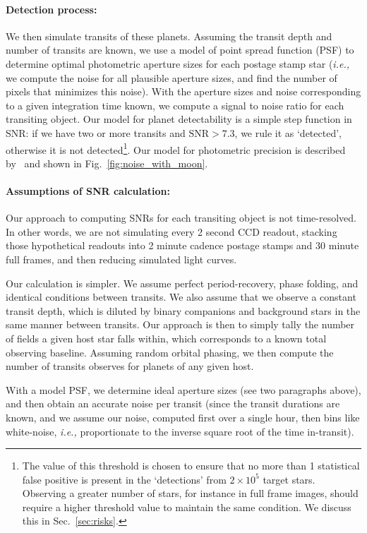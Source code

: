 \paragraph{Detection process:}
We then simulate transits of these planets.  Assuming the transit
depth and number of transits are known, we use a model of \tesss point
spread function (PSF) to determine optimal photometric aperture sizes
for each postage stamp star (\textit{i.e.,} we compute the noise for
all plausible aperture sizes, and find the number of pixels that
minimizes this noise).  With the aperture sizes and noise
corresponding to a given integration time known, we compute a signal
to noise ratio for each transiting object.  Our model for planet
detectability is a simple step function in SNR: if we have two or more
transits and $\text{SNR} > 7.3$, we rule it as `detected', otherwise
it is not detected\footnote{The value of this threshold is chosen to
  ensure that no more than 1 statistical false positive is present in
  the `detections' from $2\times10^5$ target stars. Observing a
  greater number of stars, for instance in full frame images, should
  require a higher threshold value to maintain the same condition. We
  discuss this in Sec.~\protect\ref{sec:risks}.}.  Our model for
\tesss photometric precision is described
by~ and shown in
Fig.~\ref{fig:noise_with_moon}.

\paragraph{Assumptions of SNR calculation:}
Our approach to computing SNRs for each transiting object is not
time-resolved.  In other words, we are not simulating every 2 second
CCD readout, stacking those hypothetical readouts into 2 minute
cadence postage stamps and 30 minute full frames, and then reducing
simulated light curves.

Our calculation is simpler.  We assume perfect period-recovery, phase
folding, and identical conditions between transits.  We also assume
that we observe a constant transit depth, which is diluted by binary
companions and background stars in the same manner between transits.
Our approach is then to simply tally the number of \tess fields a
given host star falls within, which corresponds to a known total
observing baseline.  Assuming random orbital phasing, we then compute
the number of transits \tess observes for planets of any given host.

With a model PSF, we determine ideal aperture sizes (see two
paragraphs above), and then obtain an accurate noise per transit
(since the transit durations are known, and we assume our noise,
computed first over a single hour, then bins like white-noise,
\textit{i.e.,} proportionate to the inverse square root of the time
in-transit).


